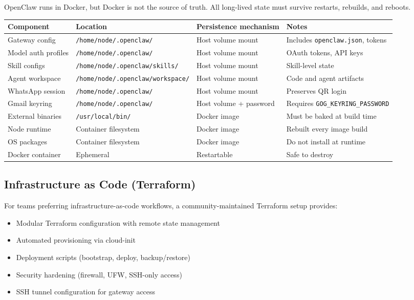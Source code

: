 OpenClaw runs in Docker, but Docker is not the source of truth.
All long-lived state must survive restarts, rebuilds, and reboots.


\begin{table}[h]
\centering
\small
\begin{tabular}{|l|l|l|l|}
\hline
Component & Location & Persistence mechanism & Notes \\
\hline
Gateway config & \texttt{/home/node/.openclaw/} & Host volume mount & Includes \texttt{openclaw.json}, tokens \\
\hline
Model auth profiles & \texttt{/home/node/.openclaw/} & Host volume mount & OAuth tokens, API keys \\
\hline
Skill configs & \texttt{/home/node/.openclaw/skills/} & Host volume mount & Skill-level state \\
\hline
Agent workspace & \texttt{/home/node/.openclaw/workspace/} & Host volume mount & Code and agent artifacts \\
\hline
WhatsApp session & \texttt{/home/node/.openclaw/} & Host volume mount & Preserves QR login \\
\hline
Gmail keyring & \texttt{/home/node/.openclaw/} & Host volume + password & Requires \texttt{GOG\_KEYRING\_PASSWORD} \\
\hline
External binaries & \texttt{/usr/local/bin/} & Docker image & Must be baked at build time \\
\hline
Node runtime & Container filesystem & Docker image & Rebuilt every image build \\
\hline
OS packages & Container filesystem & Docker image & Do not install at runtime \\
\hline
Docker container & Ephemeral & Restartable & Safe to destroy \\
\hline
\end{tabular}
\end{table}



\hrulefill


\subsection{Infrastructure as Code (Terraform)}


For teams preferring infrastructure-as-code workflows, a community-maintained Terraform setup provides:

\begin{itemize}
  \item Modular Terraform configuration with remote state management
  \item Automated provisioning via cloud-init
  \item Deployment scripts (bootstrap, deploy, backup/restore)
  \item Security hardening (firewall, UFW, SSH-only access)
  \item SSH tunnel configuration for gateway access
\end{itemize}


